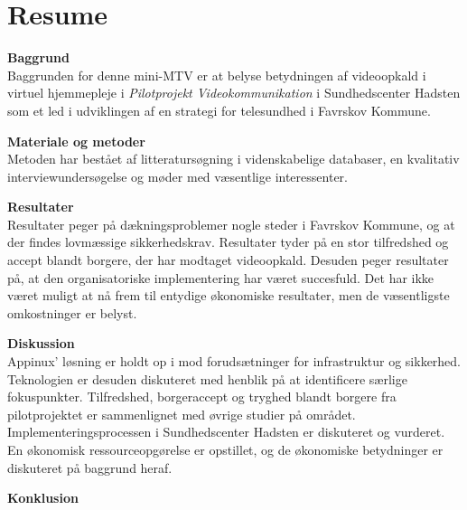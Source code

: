 \chapter{Resume}

\textbf{Baggrund}\\
Baggrunden for denne mini-MTV er at belyse betydningen af videoopkald i virtuel hjemmepleje i \textit{Pilotprojekt Videokommunikation} i Sundhedscenter Hadsten som et led i udviklingen af en strategi for telesundhed i Favrskov Kommune.

\textbf{Materiale og metoder}\\
Metoden har bestået af litteratursøgning i videnskabelige databaser, en kvalitativ interviewundersøgelse og møder med væsentlige interessenter.
 
\textbf{Resultater}\\
Resultater peger på dækningsproblemer nogle steder i Favrskov Kommune, og at der findes lovmæssige sikkerhedskrav. Resultater tyder på en stor tilfredshed og accept blandt borgere, der har modtaget videoopkald. Desuden peger resultater på, at den organisatoriske implementering har været succesfuld. Det har ikke været muligt at nå frem til entydige økonomiske resultater, men de væsentligste omkostninger er belyst. 

\textbf{Diskussion}\\
Appinux’ løsning er holdt op i mod forudsætninger for infrastruktur og sikkerhed. Teknologien er desuden diskuteret med henblik på at identificere særlige fokuspunkter. Tilfredshed, borgeraccept og tryghed blandt borgere fra pilotprojektet er sammenlignet med øvrige studier på området. Implementeringsprocessen i Sundhedscenter Hadsten er diskuteret og vurderet. En økonomisk ressourceopgørelse er opstillet, og de økonomiske betydninger er diskuteret på baggrund heraf.

\textbf{Konklusion}\\
